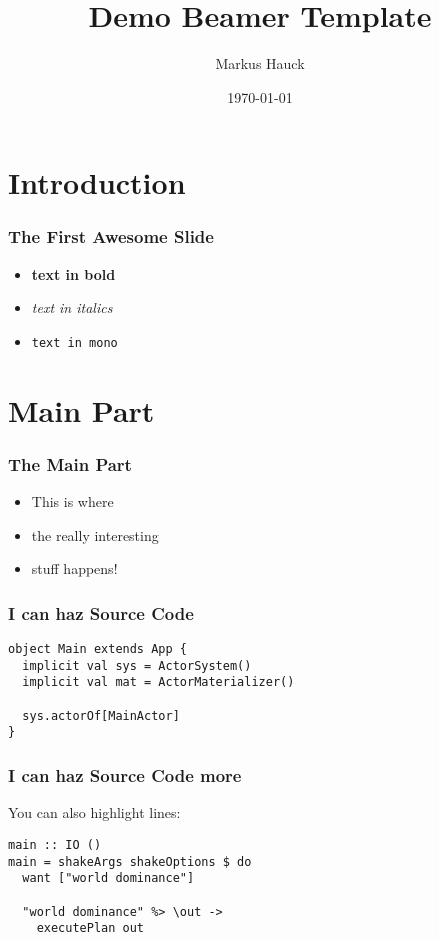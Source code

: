 \documentclass{beamer}
\title{Demo Beamer Template}
\author{Markus Hauck}
\date{\today}
\begin{document}
 
\frame{\titlepage}

\section{Introduction}
\label{sec:introduction}
 
\begin{frame}
\frametitle{The First Awesome Slide}
\begin{itemize}
\item \textbf{text in bold}
\item \textit{text in italics}
\item \texttt{text in mono}
\end{itemize}
\end{frame}

\section{Main Part}
\label{sec:main-part}
\begin{frame}
  \frametitle{The Main Part}
  \begin{itemize}
  \item This is where
  \item the really interesting
  \item stuff happens!
  \end{itemize}
\end{frame}

\begin{frame}[fragile]
  \frametitle{I can haz Source Code}
  \begin{center}
\begin{verbatim}
object Main extends App {
  implicit val sys = ActorSystem()
  implicit val mat = ActorMaterializer()
  
  sys.actorOf[MainActor]
}
\end{verbatim}
  \end{center}
\end{frame}

\begin{frame}[fragile]
  \frametitle{I can haz Source Code more}
  You can also highlight lines:
  \begin{center}
\begin{verbatim}
main :: IO ()
main = shakeArgs shakeOptions $ do
  want ["world dominance"]

  "world dominance" %> \out ->
    executePlan out
\end{verbatim}
  \end{center}
\end{frame}
\end{document}
